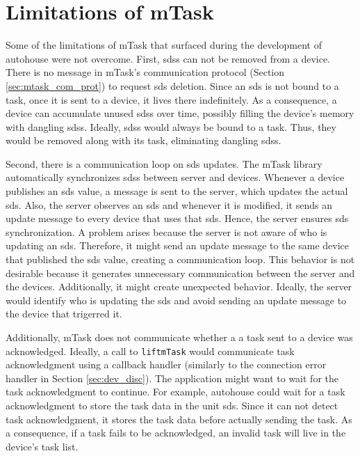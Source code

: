 \section{Limitations of mTask}\label{sec:limitations}
Some of the limitations of \gls{mTask} that surfaced during the development of \gls{autohouse} were not overcome. First, \acsp{sds} can not be removed from a device. There is no message in \gls{mTask}'s communication protocol (Section \ref{sec:mtask_com_prot}) to request \acs{sds} deletion. Since an \acs{sds} is not bound to a task, once it is sent to a device, it lives there indefinitely. As a consequence, a device can accumulate unused \acsp{sds} over time, possibly filling the device's memory with dangling \acsp{sds}. Ideally, \acsp{sds} would always be bound to a task. Thus, they would be removed along with its task, eliminating dangling \acsp{sds}. 

Second, there is a communication loop on \acs{sds} updates. The \gls{mTask} library automatically synchronizes \acsp{sds} between server and devices. Whenever a device publishes an \ac{sds} value, a message is sent to the server, which updates the actual \acs{sds}. Also, the server observes an \acs{sds} and whenever it is modified, it sends an update message to every device that uses that \acs{sds}. Hence, the server ensures \acs{sds} synchronization. A problem arises because the server is not aware of who is updating an \ac{sds}. Therefore, it might send an update message to the same device that published the \ac{sds} value, creating a communication loop. This behavior is not desirable because it generates unnecessary communication between the server and the devices. Additionally, it might create unexpected behavior. Ideally, the server would identify who is updating the \acs{sds} and avoid sending an update message to the device that trigerred it.

Additionally, \gls{mTask} does not communicate whether a  a task sent to a device was acknowledged. Ideally, a call to \texttt{liftmTask} would communicate task acknowledgment using a callback handler (similarly to the connection error handler in Section \ref{sec:dev_disc}). The application might want to wait for the task acknowledgment to continue. For example, \gls{autohouse} could wait for a task acknowledgment to store the task data in the unit \acs{sds}. Since it can not detect task acknowledgment, it stores the task data before actually sending the task. As a consequence, if a task fails to be acknowledged, an invalid task will live in the device's task list.


